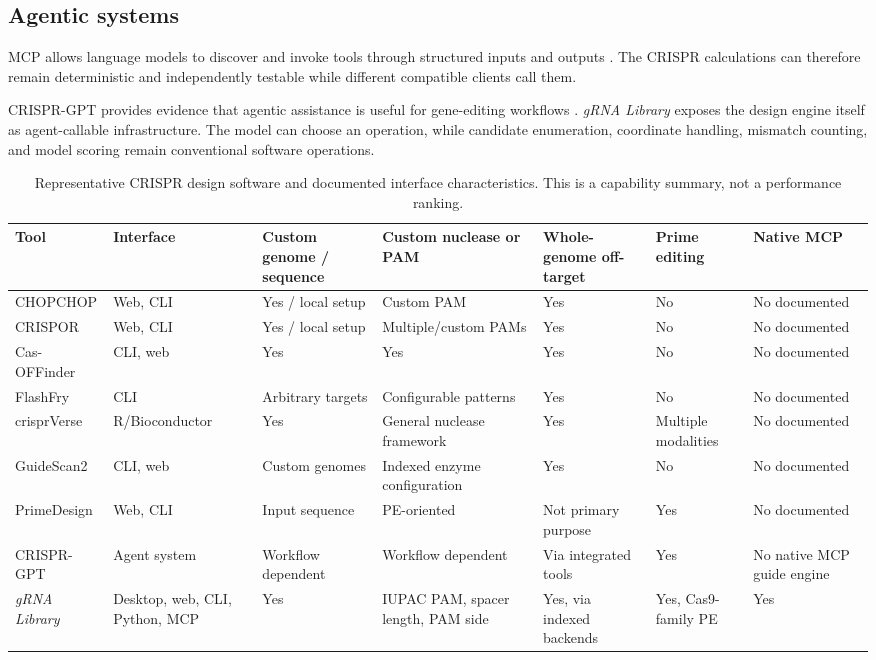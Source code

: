 \documentclass[11pt]{article}
\newcommand{\grnalib}{\textit{gRNA Library}}
\begin{document}
\subsection{Agentic systems}

MCP allows language models to discover and invoke tools through structured inputs and outputs \citep{mcp2026tools}. The CRISPR calculations can therefore remain deterministic and independently testable while different compatible clients call them.

CRISPR-GPT provides evidence that agentic assistance is useful for gene-editing workflows \citep{qu2026crisprgpt}. \grnalib{} exposes the design engine itself as agent-callable infrastructure. The model can choose an operation, while candidate enumeration, coordinate handling, mismatch counting, and model scoring remain conventional software operations.

\begin{table}[t]
\centering
\small
\caption{Representative CRISPR design software and documented interface characteristics. This is a capability summary, not a performance ranking.}
\label{tab:comparison}
\begin{tabularx}{\textwidth}{@{}lXXXXXX@{}}
\toprule
Tool & Interface & Custom genome / sequence & Custom nuclease or PAM & Whole-genome off-target & Prime editing & Native MCP \\
\midrule
CHOPCHOP & Web, CLI & Yes / local setup & Custom PAM & Yes & No & No documented \\
CRISPOR & Web, CLI & Yes / local setup & Multiple/custom PAMs & Yes & No & No documented \\
Cas-OFFinder & CLI, web & Yes & Yes & Yes & No & No documented \\
FlashFry & CLI & Arbitrary targets & Configurable patterns & Yes & No & No documented \\
crisprVerse & R/Bioconductor & Yes & General nuclease framework & Yes & Multiple modalities & No documented \\
GuideScan2 & CLI, web & Custom genomes & Indexed enzyme configuration & Yes & No & No documented \\
PrimeDesign & Web, CLI & Input sequence & PE-oriented & Not primary purpose & Yes & No documented \\
CRISPR-GPT & Agent system & Workflow dependent & Workflow dependent & Via integrated tools & Yes & No native MCP guide engine \\
\grnalib{} & Desktop, web, CLI, Python, MCP & Yes & IUPAC PAM, spacer length, PAM side & Yes, via indexed backends & Yes, Cas9-family PE & Yes \\
\bottomrule
\end{tabularx}
\end{table}
\end{document}
